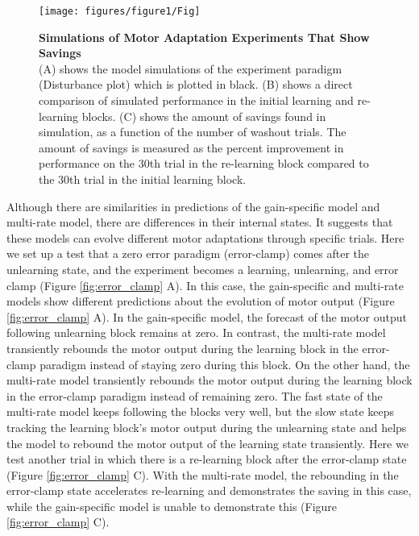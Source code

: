 \documentclass[9pt,twocolumn]{paper-template}
\begin{document}
\begin{figure*}[h!]
  \centering
    \texttt{[image: figures/figure1/Fig]}
  \caption{\textbf{Simulations of Motor Adaptation Experiments That Show Savings}\\
  (A) shows the model simulations of the experiment paradigm (Disturbance plot) which is plotted in black. (B) shows a direct comparison of simulated performance in the initial learning and re-learning blocks.  (C) shows the amount of savings found in simulation, as a function of the number of washout trials. The amount of savings is measured as the percent improvement in performance on the 30th trial in the re-learning block compared to the 30th trial in the initial learning block. 
}
  \label{fig:saving}
\end{figure*}


Although there are similarities in predictions of the gain-specific model and multi-rate model, there are differences in their internal states. It suggests that these models can evolve different motor adaptations through specific trials. Here we set up a test that a zero error paradigm (error-clamp) comes after the unlearning state, and the experiment becomes a learning, unlearning, and error clamp (Figure \ref{fig:error_clamp} A). In this case, the gain-specific and multi-rate models show different predictions about the evolution of motor output (Figure \ref{fig:error_clamp} A). In the gain-specific model, the forecast of the motor output following unlearning block remains at zero.
In contrast, the multi-rate model transiently rebounds the motor output during the learning block in the error-clamp paradigm instead of staying zero during this block. On the other hand, the multi-rate model transiently rebounds the motor output during the learning block in the error-clamp paradigm instead of remaining zero. The fast state of the multi-rate model keeps following the blocks very well, but the slow state keeps tracking the learning block's motor output during the unlearning state and helps the model to rebound the motor output of the learning state transiently. Here we test another trial in which there is a re-learning block after the error-clamp state (Figure \ref{fig:error_clamp} C). With the multi-rate model, the rebounding in the error-clamp state accelerates re-learning and demonstrates the saving in this case, while the gain-specific model is unable to demonstrate this (Figure \ref{fig:error_clamp} C).
\end{document}

